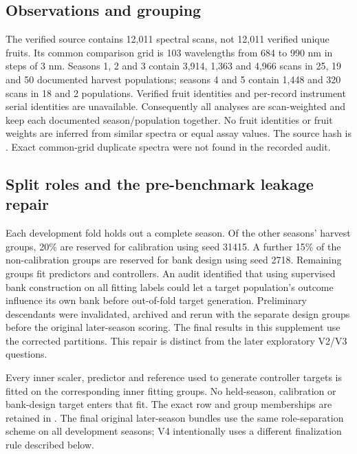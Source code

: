 \documentclass[10pt,a4paper]{article}
\begin{document}
\subsection{Observations and grouping}
The verified source contains 12,011 spectral scans, not 12,011 verified unique fruits. Its common comparison grid is 103 wavelengths from 684 to 990 nm in steps of 3 nm. Seasons 1, 2 and 3 contain 3,914, 1,363 and 4,966 scans in 25, 19 and 50 documented harvest populations; seasons 4 and 5 contain 1,448 and 320 scans in 18 and 2 populations. Verified fruit identities and per-record instrument serial identities are unavailable. Consequently all analyses are scan-weighted and keep each documented season/population together. No fruit identities or fruit weights are inferred from similar spectra or equal assay values. The source hash is . Exact common-grid duplicate spectra were not found in the recorded audit.

\subsection{Split roles and the pre-benchmark leakage repair}
Each development fold holds out a complete season. Of the other seasons' harvest groups, 20\% are reserved for calibration using seed 31415. A further 15\% of the non-calibration groups are reserved for bank design using seed 2718. Remaining groups fit predictors and controllers. An audit identified that using supervised bank construction on all fitting labels could let a target population's outcome influence its own bank before out-of-fold target generation. Preliminary descendants were invalidated, archived and rerun with the separate design groups before the original later-season scoring. The final results in this supplement use the corrected partitions. This repair is distinct from the later exploratory V2/V3 questions.

Every inner scaler, predictor and reference used to generate controller targets is fitted on the corresponding inner fitting groups. No held-season, calibration or bank-design target enters that fit. The exact row and group memberships are retained in . The final original later-season bundles use the same role-separation scheme on all development seasons; V4 intentionally uses a different finalization rule described below.
\end{document}
